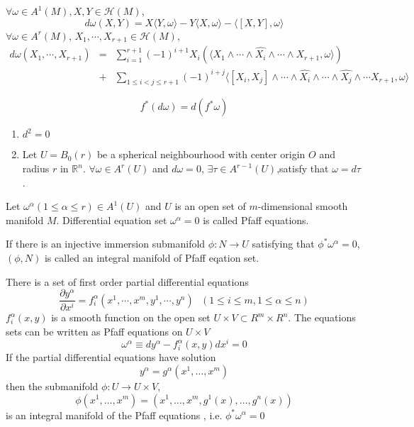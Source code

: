 \begin{newthem}
$\forall \omega \in A^1(M),X,Y \in \mathcal{H}(M)$,
\[d\omega(X,Y) = X \langle Y,\omega \rangle -Y \langle X,\omega \rangle -\langle [X,Y],\omega \rangle \] 
$\forall \omega \in A^r(M)$, $X_1,\cdots,X_{r+1} \in \mathcal{H}(M)$,
\begin{eqnarray}
d\omega(X_1,\cdots,X_{r+1}) &=& \sum_{i=1}^{r+1}(-1)^{i+1} X_{i}(\langle X_1 \wedge \cdots \wedge \hat{X_i} \wedge \cdots \wedge X_{r+1},\omega \rangle) \nonumber \\
&+& \sum_{1 \leq i < j \leq r+1}(-1)^{i+j} \langle [X_i,X_j] \wedge \cdots \wedge \hat{X_i} \wedge \cdots \wedge \hat{X_j} \wedge \cdots X_{r+1},\omega \rangle \nonumber
\end{eqnarray}
\end{newthem}

\begin{newthem}
\[f^{*}(d\omega) = d(f^* \omega)\]
\end{newthem}

\begin{newlemma}
\begin{enumerate}
\item $d^2=0$
\item Let $U=B_0(r)$ be a spherical neighbourhood with center origin $O$ and radius $r$ in $\mathbb{R}^n$. $\forall \omega \in A^r(U)$ and $d\omega =0$, $\exists \tau \in A^{r-1}(U)$,satisfy that $\omega = d\tau$.
\end{enumerate}
\end{newlemma}

\begin{newdef}
Let $\omega^{\alpha}(1 \leq \alpha \leq r) \in A^1(U)$ and $U$ is an open set of $m$-dimensional smooth manifold $M$. Differential equation set $\omega^{\alpha} = 0$ is called Pfaff equations.
\end{newdef}

\begin{newdef}
If there is an injective immersion submanifold $\phi:N \to U$ satisfying that $\phi^{*} \omega^{\alpha} = 0$,$(\phi,N)$ is called an integral manifold of Pfaff eqation set.
\end{newdef}

\begin{newprop}
There is a set of first order partial differential equations
\[\frac{\partial y^{\alpha}}{\partial x^i} = f^{\alpha}_{i}(x^1,\cdots,x^{m},y^1,\cdots,y^{n}) \ \ \ (1 \leq i \leq m,1 \leq \alpha \leq n)\]
$f^{\alpha}_{i}(x,y)$ is a smooth function on the open set $U \times V \subset R^m \times R^n$. The equations sets can be written as Pfaff equations on $U \times V$
\[\omega^{\alpha} \equiv dy^{\alpha} - f^{\alpha}_{i}(x,y)dx^i = 0\]
If the partial differential equations have solution
\[y^{\alpha} = g^{\alpha}(x^1,\ldots,x^m)\]
then the submanifold $\phi:U \to U \times V$,
\[\phi(x^1,\ldots,x^m) = (x^1,\ldots,x^m,g^1(x),\ldots,g^n(x))\]
is an integral manifold of the Pfaff equations , i.e. $\phi^* \omega^{\alpha} =0$
\end{newprop}

